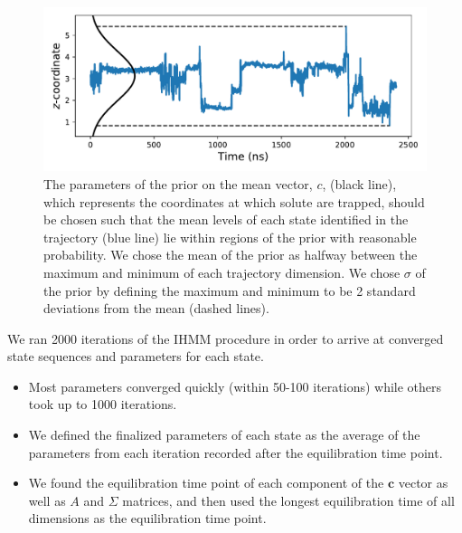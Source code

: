 \documentclass{article}
\begin{document}
  \begin{figure}
  \centering
  \includegraphics[width=\textwidth]{prior_guesses.pdf}
  \caption{The parameters of the prior on the mean vector, $c$, (black line), which
  represents the coordinates at which solute are trapped, should be chosen such
  that the mean levels of each state identified in the trajectory (blue line) lie within
  regions of the prior with reasonable probability. We chose the mean of the prior 
  as halfway between the maximum and minimum of each trajectory dimension. We chose 
  $\sigma$ of the prior by defining the maximum and minimum to be 2 standard deviations
  from the mean (dashed lines).}\label{fig:prior_guesses}
  \end{figure}
  
  We ran 2000 iterations of the IHMM procedure in order to arrive at converged 
  state sequences and parameters for each state.
  \begin{itemize}  
   \item Most parameters converged quickly (within 50-100 iterations) while
    others took up to 1000 iterations.
    \item We defined the finalized parameters of each state as the average
    of the parameters from each iteration recorded after the equilibration 
    time point.
    \item We found the equilibration time point of each component of the 
    $\mathbf{c}$ vector as well as $A$ and $\Sigma$ matrices, and then used the longest
    equilibration time of all dimensions as the equilibration time point.
  \end{itemize}
  
\end{document}
